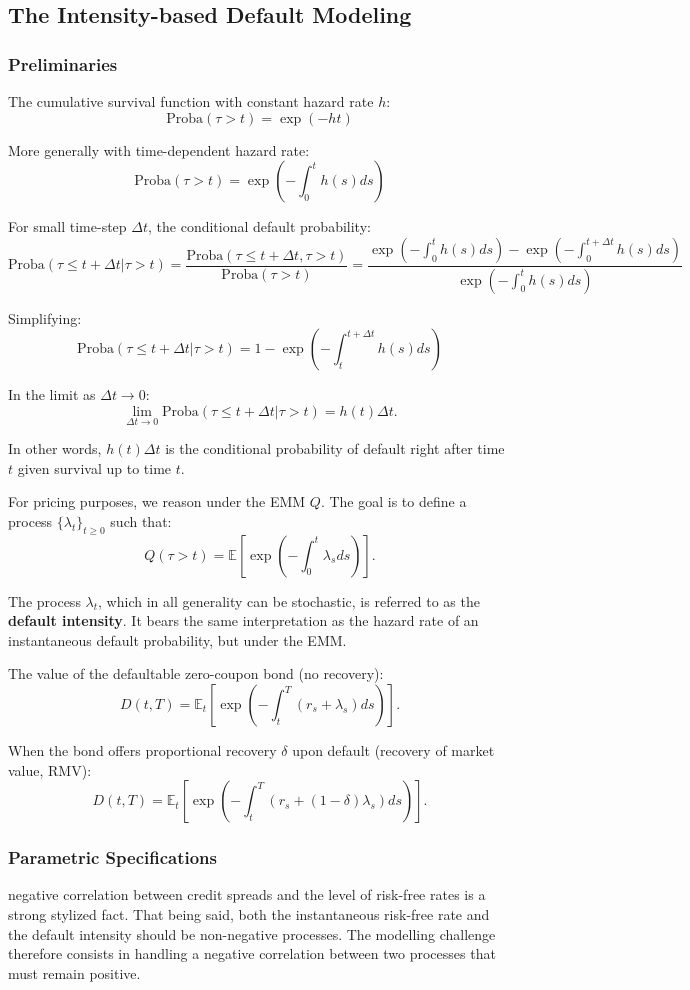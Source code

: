 \documentclass[12pt,a4paper]{article}
\begin{document}
\subsection{ The Intensity-based Default Modeling }
\subsubsection{Preliminaries }
The cumulative survival function with constant hazard rate $h$:
$$\text{Proba}(\tau > t) = \exp(-ht)$$

More generally with time-dependent hazard rate:
$$\text{Proba}(\tau > t) = \exp\left(-\int_0^t h(s)ds\right)$$

For small time-step $\Delta t$, the conditional default probability:
$$\text{Proba}(\tau \leq t + \Delta t | \tau > t) = \frac{\text{Proba}(\tau \leq t + \Delta t, \tau > t)}{\text{Proba}(\tau > t)} = \frac{\exp\left(-\int_0^t h(s)ds\right) - \exp\left(-\int_0^{t+\Delta t} h(s)ds\right)}{\exp\left(-\int_0^t h(s)ds\right)}$$

Simplifying:
$$\text{Proba}(\tau \leq t + \Delta t | \tau > t) = 1 - \exp\left(-\int_t^{t+\Delta t} h(s)ds\right)$$

In the limit as $\Delta t \to 0$:
$$\lim_{\Delta t \to 0} \text{Proba}(\tau \leq t + \Delta t | \tau > t) = h(t)\Delta t.$$

In other words, $h(t)\Delta t$ is the conditional probability of default right after time $t$ given survival up to time $t$.

For pricing purposes, we reason under the EMM $Q$. The goal is to define a process $\{\lambda_t\}_{t \geq 0}$ such that:
$$Q(\tau > t) = \mathbb{E}\left[\exp\left(-\int_0^t \lambda_s ds\right)\right].$$

The process $\lambda_t$, which in all generality can be stochastic, is referred to as the \textbf{default intensity}. It bears the same interpretation as the hazard rate of an instantaneous default probability, but under the EMM.

The value of the defaultable zero-coupon bond (no recovery):
$$D(t,T) = \mathbb{E}_t\left[\exp\left(-\int_t^T (r_s + \lambda_s)ds\right)\right].$$

When the bond offers proportional recovery $\delta$ upon default (recovery of market value, RMV):
$$D(t,T) = \mathbb{E}_t\left[\exp\left(-\int_t^T (r_s + (1-\delta)\lambda_s)ds\right)\right].$$

\subsubsection{Parametric Specifications }
negative correlation between credit spreads and the level of risk-free rates is a strong stylized fact. That 
being said, both the instantaneous risk-free rate and the default intensity should be non-negative 
processes. The modelling challenge therefore consists in handling a negative correlation between 
two processes that must remain positive.
\end{document}
